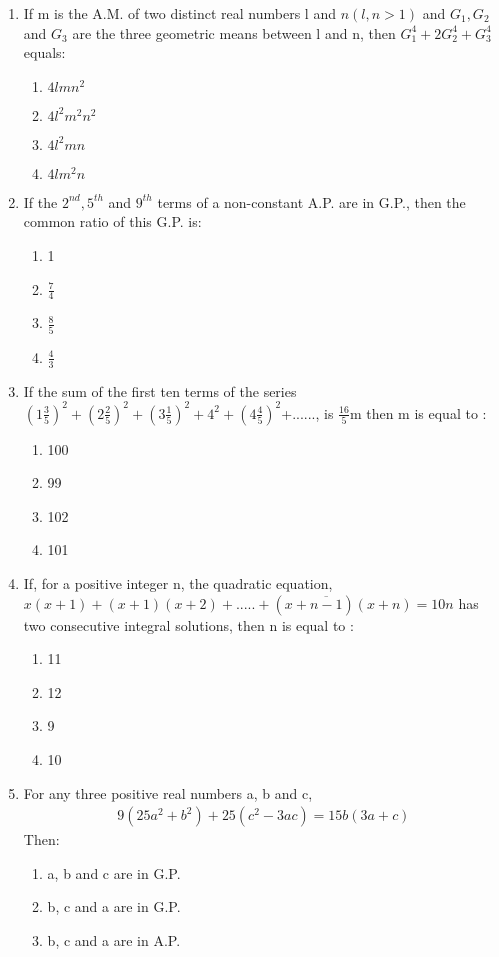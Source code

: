 \begin{enumerate}[label=\arabic*.,ref=\thesubsection.\theenumi]
\item If m is the A.M. of two distinct real numbers l and $n(l,n>1)$ and $G_1,G_2$ and $G_3$ are the three geometric means between l and n, then $G_1^4+2G_2^4+G_3^4$ equals:
\begin{enumerate}
\item $4lmn^2$
\item $4l^2m^2n^2$
\item $4l^2mn$
\item $4lm^2n$
\end{enumerate}
\item If the $2^{nd},5^{th}$ and $9^{th}$ terms of a non-constant A.P. are in G.P., then the common ratio of this G.P. is:
\begin{enumerate}
\item 1
\item $\frac{7}{4}$
\item $\frac{8}{5}$
\item $\frac{4}{3}$
\end{enumerate}
\item If the sum of the first ten terms of the series $(1\frac{3}{5})^2+(2\frac{2}{5})^2+(3\frac{1}{5})^2+4^2+(4\frac{4}{5})^2$+......, is $\frac{16}{5}$m then m is equal to :
\begin{enumerate}
\item 100
\item 99
\item 102
\item 101
\end{enumerate}
\item If, for a positive integer n, the quadratic equation, $x(x+1)+(x+1)(x+2)+.....+(x+\overline{n-1})(x+n)=10n$ has two consecutive integral solutions, then n is equal to :
\begin{enumerate}
\item 11
\item 12
\item 9
\item 10
\end{enumerate}
\item For any three positive real numbers a, b and c, 
\begin{align} 
9(25a^2+b^2)+25(c^2-3ac)=15b(3a+c)
\end{align} Then:
\begin{enumerate}
\item a, b and c are in G.P.
\item b, c and a are in G.P.
\item b, c and a are in A.P.

\end{enumerate}
\end{enumerate}
